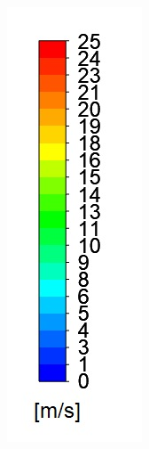 \documentclass{webofc}
\begin{document}
\begin{figure}[h!]
\includegraphics[scale = 0.3]{velo}

\end{figure}
\end{document}
